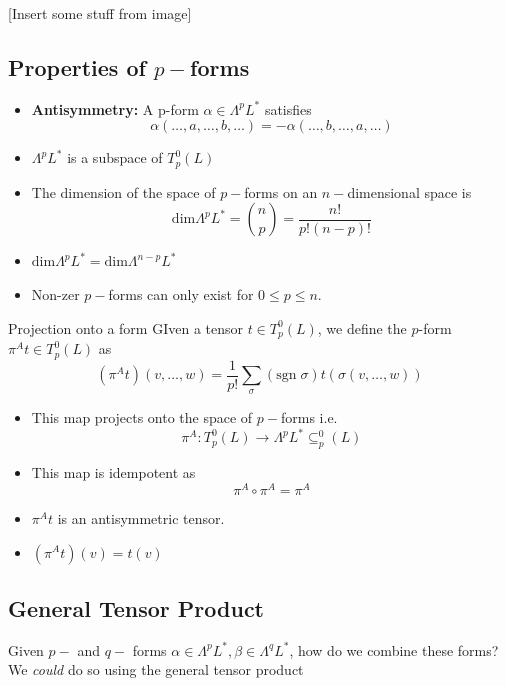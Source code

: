 \documentclass{article}
\begin{document}
\vskip 1cm
[Insert some stuff from image]

\vskip 1cm
\subsection{Properties of $p-$forms}

\begin{itemize}
  \item \textbf{Antisymmetry:} A p-form $\alpha \in \Lambda^p L^*$ satisfies 
  \[  \alpha(\dots, a, \dots, b, \dots) = -\alpha(\dots, b, \dots, a, \dots) \]
  \item $\Lambda^p L^*$ is a subspace of $T_p^0(L)$
  \item The dimension of the space of $p-$forms on an $n-$dimensional space is 
  \[  \text{dim}\Lambda^p L^* = \binom{n}{p} = \frac{n!}{p!(n-p)!}  \]
  \item $\text{dim} \Lambda^p L^* = \text{dim} \Lambda^{n-p} L^*$
  \item Non-zer $p-$forms can only exist for $0 \leq p \leq n$.
\end{itemize}

\vskip 0.5cm
\begin{mathdefinitionbox}{Projection onto a form}
  GIven a tensor $t \in T_p^0(L)$, we define the $p$-form $\pi^A t \in T_p^0(L)$ as 
  \[ (\pi^A t)(v, \dots, w) = \frac{1}{p!} \sum_{\sigma} (\text{sgn}\;\sigma) t(\sigma(v,\dots, w))  \]
\end{mathdefinitionbox}


\begin{itemize}
  \item This map projects onto the space of $p-$forms i.e.
  \[ \pi^A : T_p^0(L) \rightarrow \Lambda^p L^* \subseteq _p^0(L)  \]
  \item This map is idempotent as 
  \[ \pi^A \circ \pi^A = \pi^A  \]
  \item $\pi^A t$ is an antisymmetric tensor.
  \item $(\pi^A t)(v) = t(v)$
\end{itemize}


\vskip 0.5cm
\subsection{General Tensor Product}

Given $p-$ and $q-$ forms $\alpha \in \Lambda^p L^*, \beta \in \Lambda^q L^*$, how do we combine these forms? We \emph{could }do so using the general tensor product
\end{document}
